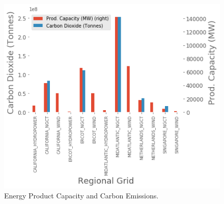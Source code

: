 \begin{figure}
  \centering
  \includegraphics[scale=0.4]{marginal_energy_cost/img/sources.png}
  \caption[Energy Product Capacity and Carbon Emissions]{Energy Product Capacity and Carbon Emissions.}
  \label{fig:source_prod_comp}
  \end{figure}